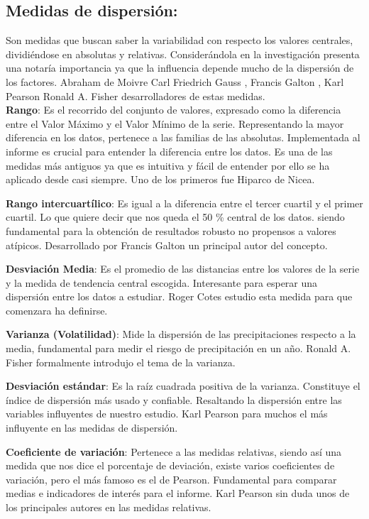 \documentclass[oneside,11pt]{Latex/Classes/PhDthesisPSnPDF}
\begin{document}
\subsection{Medidas de dispersión: }

Son medidas que buscan saber la variabilidad con respecto los valores
centrales, dividiéndose en absolutas y relativas. Considerándola en la
investigación presenta una notaría importancia ya que la influencia
depende mucho de la dispersión de los factores. Abraham de Moivre Carl
Friedrich Gauss , Francis Galton , Karl Pearson Ronald A. Fisher
desarrolladores de estas medidas.\\

\textbf{Rango}: Es el recorrido del conjunto de valores, expresado como
la diferencia entre el Valor Máximo y el Valor Mínimo de la serie.
Representando la mayor diferencia en los datos, pertenece a las familias
de las absolutas. Implementada al informe es crucial para entender la
diferencia entre los datos. Es una de las medidas más antiguos ya que es
intuitiva y fácil de entender por ello se ha aplicado desde casi
siempre. Uno de los primeros fue Hiparco de Nicea.

\textbf{Rango intercuartílico}: Es igual a la diferencia entre el tercer
cuartil y el primer cuartil. Lo que quiere decir que nos queda el 50 \%
central de los datos. siendo fundamental para la obtención de resultados
robusto no propensos a valores atípicos. Desarrollado por Francis Galton
un principal autor del concepto.

\textbf{Desviación Media}: Es el promedio de las distancias entre los
valores de la serie y la medida de tendencia central escogida.
Interesante para esperar una dispersión entre los datos a estudiar.
Roger Cotes estudio esta medida para que comenzara ha definirse.

\textbf{Varianza (Volatilidad)}: Mide la dispersión de las
precipitaciones respecto a la media, fundamental para medir el riesgo de
precipitación en un año. Ronald A. Fisher formalmente introdujo el tema
de la varianza.

\textbf{Desviación estándar}: Es la raíz cuadrada positiva de la
varianza. Constituye el índice de dispersión más usado y confiable.
Resaltando la dispersión entre las variables influyentes de nuestro
estudio. Karl Pearson para muchos el más influyente en las medidas de
dispersión.

\textbf{Coeficiente de variación}: Pertenece a las medidas relativas,
siendo así una medida que nos dice el porcentaje de deviación, existe
varios coeficientes de variación, pero el más famoso es el de Pearson.
Fundamental para comparar medias e indicadores de interés para el
informe. Karl Pearson sin duda unos de los principales autores en las
medidas relativas.
\end{document}
